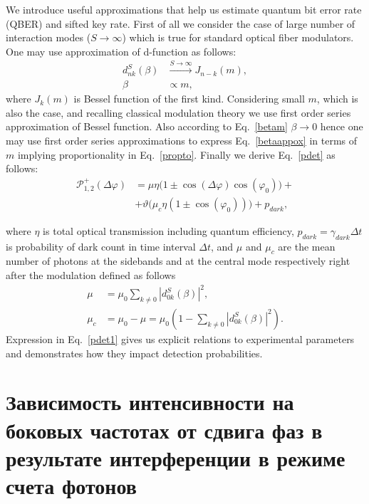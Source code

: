 We introduce useful approximations that help us estimate quantum bit error rate (QBER) and sifted key rate. First of all we consider the case of large number of interaction modes ($S\rightarrow \infty$) which is true for standard optical fiber modulators. One may use approximation of d-function as follows:
\begin{align}
d_{nk}^S(\beta) &\xrightarrow{S\rightarrow \infty} J_{n-k}(m), \label{limdj} \\
\beta &\propto m, \label{propto}
\end{align}
where $J_k(m)$ is Bessel function of the first kind. Considering small $m$, which is also the case, and recalling classical modulation theory we use first order series approximation of Bessel function.
Also according to Eq.~\ref{betam} $\beta \rightarrow 0$ hence one may use first order series approximations to express Eq.~\ref{betaappox} in terms of $m$ implying proportionality in Eq.~\ref{propto}.
Finally we derive Eq.~\ref{pdet} as follows:
\begin{align}\label{pdet1}
 \mathcal{P}_{1,2}^{+}(\Delta\varphi)&=\mu\eta\Big(1\pm\cos(\Delta\varphi)\cos(\varphi_0)\Big)+ \nonumber
 \\
 &+\vartheta\Big(\mu_c\eta(1\pm\cos(\varphi_0))\Big)+p_{dark},
\end{align}


where $\eta$ is total optical transmission including quantum efficiency, $p_{dark}=\gamma_{dark}\Delta t$ is probability of dark count in time interval $\Delta t$, and $\mu$ and $\mu_c$ are the mean number of photons at the sidebands and at the central mode respectively right after the modulation defined as follows
\begin{align}
    \mu&=\mu_0\sum_{k\neq 0}|d_{0k}^{S}(\beta)|^2, \\
    \mu_c&=\mu_0-\mu=\mu_0(1-\sum_{k\neq 0}|d_{0k}^{S}(\beta)|^2).
\end{align}
Expression in Eq.~\ref{pdet1} gives us explicit relations to experimental parameters and demonstrates how they impact detection probabilities.



\pagebreak

\section{Зависимость интенсивности на боковых частотах от сдвига фаз в результате интерференции в режиме счета фотонов} \label{ch:ch5/sect6}


